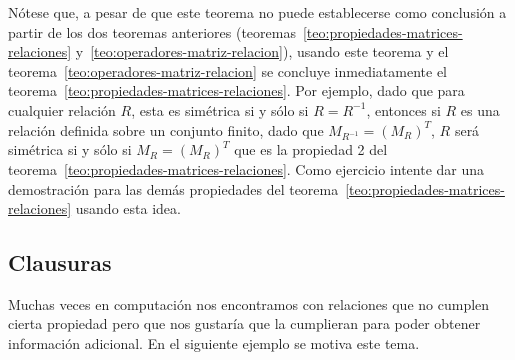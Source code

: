 \begin{teorema}
Nótese que, a pesar de que este teorema no puede establecerse como conclusión a partir de los dos teoremas anteriores (teoremas~\ref{teo:propiedades-matrices-relaciones} y~\ref{teo:operadores-matriz-relacion}), usando este teorema y el teorema~\ref{teo:operadores-matriz-relacion} se concluye inmediatamente el teorema~\ref{teo:propiedades-matrices-relaciones}.
Por ejemplo, dado que para cualquier relación $R$, esta es simétrica si y sólo si $R=R^{-1}$, entonces si $R$ es una relación definida sobre un conjunto finito, dado que $M_{R^{-1}}=(M_R)^T$, $R$ será simétrica si y sólo si $M_R=(M_R)^T$ que es la propiedad 2 del teorema~\ref{teo:propiedades-matrices-relaciones}.
Como ejercicio intente dar una demostración para las demás propiedades del teorema~\ref{teo:propiedades-matrices-relaciones} usando esta idea. 
\end{teorema}

\subsection{Clausuras}
Muchas veces en computación nos encontramos con relaciones que no cumplen cierta propiedad pero que nos gustaría que la cumplieran para poder obtener información adicional.
En el siguiente ejemplo se motiva este tema.

